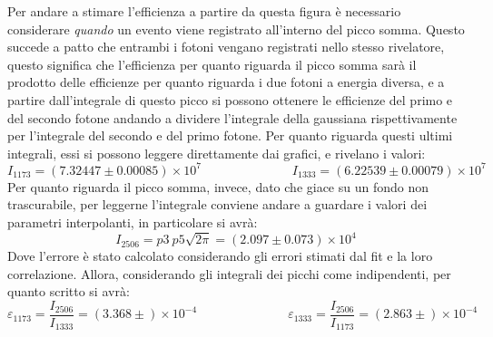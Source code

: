 Per andare a stimare l'efficienza a partire da questa figura è necessario considerare \textit{quando} un evento viene registrato all'interno del picco somma. Questo succede
a patto che entrambi i fotoni vengano registrati nello stesso rivelatore, questo significa che l'efficienza per quanto riguarda il picco somma sarà il prodotto delle efficienze
per quanto riguarda i due fotoni a energia diversa, e a partire dall'integrale di questo picco si possono ottenere le efficienze del primo e del secondo fotone andando a
dividere l'integrale della gaussiana rispettivamente per l'integrale del secondo e del primo fotone. Per quanto riguarda questi ultimi integrali, essi si possono leggere
direttamente dai grafici, e rivelano i valori:
$$I_{1173} = (7.32447 \pm 0.00085)\times 10^7 \hspace{3cm} I_{1333} = (6.22539 \pm 0.00079)\times 10^7$$
Per quanto riguarda il picco somma, invece, dato che giace su un fondo non trascurabile, per leggerne l'integrale conviene andare a guardare i valori dei parametri
interpolanti, in particolare si avrà:
$$I_{2506}= p3\ p5\sqrt{2\pi} = (2.097 \pm 0.073)\times 10^4$$
Dove l'errore è stato calcolato considerando gli errori stimati dal fit e la loro correlazione. Allora, considerando gli integrali dei picchi come indipendenti, per quanto
scritto si avrà:
$$\varepsilon_{1173}=\frac{I_{2506}}{I_{1333}}=(3.368 \pm )\times 10^{-4} \hspace{3cm} \varepsilon_{1333}=\frac{I_{2506}}{I_{1173}}=(2.863 \pm )\times 10^{-4}$$
